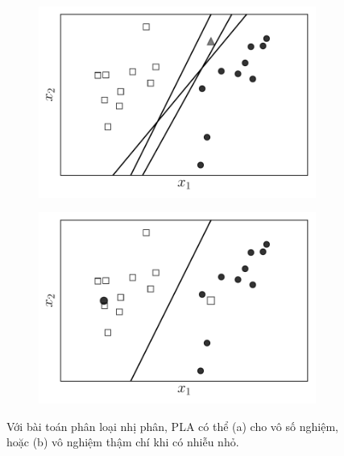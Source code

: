 \begin{figure}[t]
    \begin{subfigure}{0.49\textwidth}
    \includegraphics[width=0.99\linewidth]{ebookML_src/src/perceptron/pla6.pdf}
    \caption{}
    \label{fig:9_6a}
    \end{subfigure}
    \begin{subfigure}{0.49\textwidth}
    \includegraphics[width=0.99\linewidth]{ebookML_src/src/perceptron/pla7.pdf}
    \caption{}
    \label{fig:9_6b}
    \end{subfigure}
    \caption{
    Với bài toán phân loại nhị phân, PLA có thể (a) cho vô số nghiệm, hoặc (b) vô nghiệm thậm chí khi có nhiễu nhỏ. 
    }
    \label{fig:9_6}
\end{figure}

